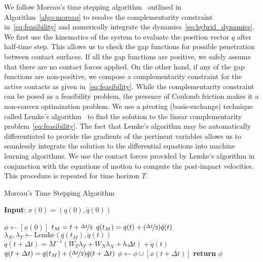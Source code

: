 We follow Moreau's time stepping algorithm~\cite{glocker2005formulation}
outlined in Algorithm~\eqref{algo:moreau} to resolve the complementarity
constraint in~\eqref{eq:feasibility} and numerically integrate the
dynamics~\eqref{eq:hybrid_dynamics}. 
%
We first use the kinematics of the system to evaluate the position vector $q$
after half-time step.
%
This allows us to check the gap functions for possible penetration between
contact surfaces.
%
If all the gap functions are positive, we safely assume that there are no
contact forces applied.
%
On the other hand, if any of the gap functions are non-positive, we compose a
complementarity constraint for the active contacts as given
in~\eqref{eq:feasibility}.
%
While the complementarity constraint can be posed as a feasibility problem, the
presence of Coulomb friction makes it a non-convex optimization problem. 
%
We use a pivoting (basis-exchange) technique called Lemke's
algorithm~\cite{acary2008numerical} to find the solution to the linear
complementarity problem~\eqref{eq:feasibility}. The fact that Lemke's algorithm
may be automatically differentiated to provide the gradients of the pertinent
variables allows us to seamlessly integrate the solution to the differential
equations into machine learning algorithms.
%
We use the contact forces provided by Lemke's algorithm in conjunction with the
equations of motion to compute the post-impact velocities.
%
This procedure is repeated for time horizon $T$.
\begin{algorithm}[H]
    \caption{Moreau's Time Stepping Algorithm}
    \label{algo:moreau}
    \small
    \hspace*{\algorithmicindent} \textbf{Input}: $x(0) = (q(0), \dot{q}(0))$
    \begin{algorithmic}[1]
      \State $\phi \leftarrow  [x(0)]$ 
           
            \State $t_M = t + \nicefrac{\Delta t}{2}$
            \State $q(t_M) = q(t) +  (\nicefrac{\Delta t}{2}) \dot{q}(t) $
            \State $\lambda_N, \lambda_T \leftarrow \text{Lemke}(q(t_M), \dot{q}(t))$ 
            \State $\dot{q}(t+\Delta t) = M^{-1}(W_T \lambda_T + W_N \lambda_N + h\Delta t) + \dot{q}(t)$
            \State $q(t + \Delta t) =  q(t_M) +  (\nicefrac{\Delta t}{2})\dot{q}(t+\Delta t)$
            \State $\phi \leftarrow \phi \cup [x(t+\Delta t)]$
          \EndFor
        \State \textbf{return} $\phi$
    \end{algorithmic}
\end{algorithm}
%

